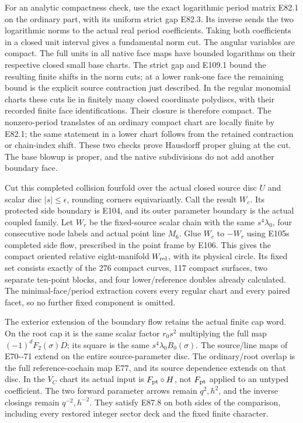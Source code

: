 For an analytic compactness check, use the exact logarithmic period matrix E82.1 on the ordinary part, with its uniform strict gap E82.3. Its inverse sends the two logarithmic norms to the actual real period coefficients. Taking both coefficients in a closed unit interval gives a fundamental norm cut. The angular variables are compact. The full units in all native face maps have bounded logarithms on their respective closed small base charts. The strict gap and E109.1 bound the resulting finite shifts in the norm cuts; at a lower rank-one face the remaining bound is the explicit source contraction just described. In the regular monomial charts these cuts lie in finitely many closed coordinate polydiscs, with their recorded finite face identifications. Their closure is therefore compact. The nonzero-period translates of an ordinary compact chart are locally finite by E82.1; the same statement in a lower chart follows from the retained contraction or chain-index shift. These two checks prove Hausdorff proper gluing at the cut. The base blowup is proper, and the native subdivisions do not add another boundary face.

Cut this completed collision fourfold over the actual closed source disc \(U\) and scalar disc \(|s|\leq\epsilon\), rounding corners equivariantly. Call the result \(W_c\). Its protected side boundary is E104, and its outer parameter boundary is the actual coupled family. Let \(W_r\) be the fixed-source scalar chain with the same \(s^4\lambda_0\), four consecutive node labels and actual point line \(M_6\). Glue \(W_c\) to \(-W_r\) using E105\textquotesingle s completed side flow, prescribed in the point frame by E106. This gives the compact oriented relative eight-manifold \(W_{\rm rel}\), with its physical circle. Its fixed set consists exactly of the 276 compact curves, 117 compact surfaces, two separate ten-point blocks, and four lower/reference doubles already calculated. The minimal-face/period extraction covers every regular chart and every paired facet, so no further fixed component is omitted.

The exterior extension of the boundary flow retains the actual finite cap word. On the root cap it is the same scalar factor \(r_0s^2\) multiplying the full map \((-1)^dF_2(\sigma)D\); its square is the same \(s^4\lambda_0 B_0(\sigma)\). The source/line maps of E70-\/-71 extend on the entire source-parameter disc. The ordinary/root overlap is the full reference-cochain map E77, and its source dependence extends on that disc. In the \(V_C\) chart its actual input is \(F_{\rm pt}\circ H\), not \(F_{\rm pt}\) applied to an untyped coefficient. The two forward parameter arrows remain \(q^2,h^2\), and the inverse closings remain \(q^{-2},h^{-2}\). They satisfy E87.8 on both sides of the comparison, including every restored integer sector deck and the fixed finite character.

